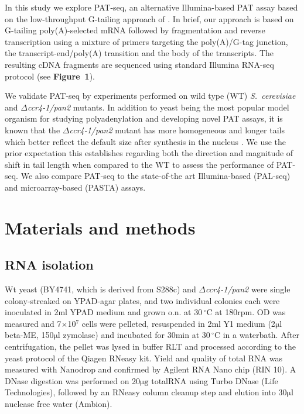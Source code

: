 \documentclass[10pt]{article}
\newcommand{\mul}{\ensuremath{\mathrm{\mu l}} }
\newcommand{\C}{\,$^{\circ}\mathrm{C}$ }
\begin{document}
In this study we explore PAT-seq, an alternative Illumina-based PAT assay based on the low-throughput G-tailing approach of \cite{kusov01}. In brief, our approach is based on G-tailing poly(A)-selected mRNA followed by fragmentation and reverse transcription using a mixture of primers targeting the poly(A)/G-tag junction, the transcript-end/poly(A) transition and the body of the transcripts. The resulting cDNA fragments are sequenced using standard Illumina RNA-seq protocol (see \textbf{Figure~1}).

We validate PAT-seq by experiments performed on wild type (WT) \textit{S.~cerevisiae} and \textit{$\Delta$ccr4-1/pan2} mutants. In addition to yeast being the most popular model organism for studying polyadenylation and developing novel PAT assays, it is known that the \textit{$\Delta$ccr4-1/pan2} mutant has more homogeneous and longer tails which better reflect the default size after synthesis in the nucleus \cite{beilharz07,traven05}. We use the prior expectation this establishes regarding both the direction and magnitude of shift in tail length when compared to the WT to assess the performance of PAT-seq. We also compare PAT-seq to the state-of-the art Illumina-based (PAL-seq) and microarray-based (PASTA) assays.

\section*{Materials and methods}

\subsection*{RNA isolation}

Wt yeast (BY4741, which is derived from S288c) and \textit{$\Delta$ccr4-1/pan2} \cite{beilharz07} were single colony-streaked on YPAD-agar plates, and two individual colonies each were inoculated in 2ml YPAD medium and grown o.n. at 30\C at 180rpm. OD was measured and 7$\times$10$^7$ cells were pelleted, resuspended in 2ml Y1 medium (2\mul beta-ME, 150\mul zymolase) and incubated for 30min at 30\C in a waterbath. After centrifugation, the pellet was lysed in buffer RLT and processed according to the yeast protocol of the Qiagen RNeasy kit. Yield and quality of total RNA was measured with Nanodrop and confirmed by Agilent RNA Nano chip (RIN 10). A DNase digestion was performed on 20$\mathrm{\mu g}$ totalRNA using Turbo DNase (Life Technologies), followed by an RNeasy column cleanup step and elution into 30\mul nuclease free water (Ambion).
\end{document}

